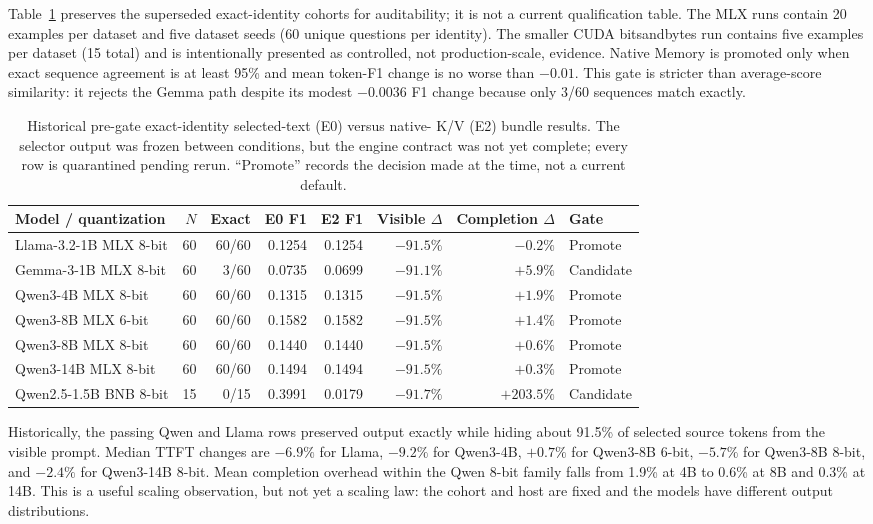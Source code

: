 \documentclass[11pt]{article}
\begin{document}
Table~\ref{tab:quantized-bundle-quality} preserves the superseded exact-identity
cohorts for auditability; it is not a current qualification table.
The MLX runs contain 20 examples per dataset and five dataset seeds (60 unique
questions per identity). The smaller CUDA bitsandbytes run contains five
examples per dataset (15 total) and is intentionally presented as controlled,
not production-scale, evidence. Native Memory is promoted only when exact
sequence agreement is at least 95\% and mean token-F1 change is no worse than
$-0.01$. This gate is stricter than average-score similarity: it rejects the
Gemma path despite its modest $-0.0036$ F1 change because only 3/60 sequences
match exactly.

\begin{table}[H]
\centering
\scriptsize
\caption{Historical pre-gate exact-identity selected-text (E0) versus native-
K/V (E2) bundle results. The selector output was frozen between conditions,
but the engine contract was not yet complete; every row is quarantined pending
rerun. ``Promote'' records the decision made at the time, not a current default.}
\begin{tabular}{lrrrrrrl}
\toprule
Model / quantization & $N$ & Exact & E0 F1 & E2 F1 & Visible $\Delta$ & Completion $\Delta$ & Gate \\
\midrule
Llama-3.2-1B MLX 8-bit & 60 & 60/60 & 0.1254 & 0.1254 & $-91.5\%$ & $-0.2\%$ & Promote \\
Gemma-3-1B MLX 8-bit & 60 & 3/60 & 0.0735 & 0.0699 & $-91.1\%$ & $+5.9\%$ & Candidate \\
Qwen3-4B MLX 8-bit & 60 & 60/60 & 0.1315 & 0.1315 & $-91.5\%$ & $+1.9\%$ & Promote \\
Qwen3-8B MLX 6-bit & 60 & 60/60 & 0.1582 & 0.1582 & $-91.5\%$ & $+1.4\%$ & Promote \\
Qwen3-8B MLX 8-bit & 60 & 60/60 & 0.1440 & 0.1440 & $-91.5\%$ & $+0.6\%$ & Promote \\
Qwen3-14B MLX 8-bit & 60 & 60/60 & 0.1494 & 0.1494 & $-91.5\%$ & $+0.3\%$ & Promote \\
Qwen2.5-1.5B BNB 8-bit & 15 & 0/15 & 0.3991 & 0.0179 & $-91.7\%$ & $+203.5\%$ & Candidate \\
\bottomrule
\end{tabular}
\label{tab:quantized-bundle-quality}
\end{table}

Historically, the passing Qwen and Llama rows preserved output exactly while hiding about
91.5\% of selected source tokens from the visible prompt. Median TTFT changes
are $-6.9\%$ for Llama, $-9.2\%$ for Qwen3-4B, $+0.7\%$ for Qwen3-8B 6-bit,
$-5.7\%$ for Qwen3-8B 8-bit, and $-2.4\%$ for Qwen3-14B 8-bit. Mean completion
overhead within the Qwen 8-bit family falls from 1.9\% at 4B to 0.6\% at 8B
and 0.3\% at 14B. This is a useful scaling observation, but not yet a scaling
law: the cohort and host are fixed and the models have different output
distributions.
\end{document}
